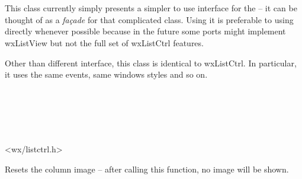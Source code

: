 
\section{}\label{wxlistview}

This class currently simply presents a simpler to use interface for the 
 -- it can be thought of as a {\it fa\c{c}ade}
for that complicated class. Using it is preferable to using 
 directly whenever possible because in the
future some ports might implement wxListView but not the full set of wxListCtrl
features.

Other than different interface, this class is identical to wxListCtrl. In
particular, it uses the same events, same windows styles and so on.


\\
\\
\\
\\


<wx/listctrl.h>


\label{wxlistviewclearcolumnimage}


Resets the column image -- after calling this function, no image will be shown.






